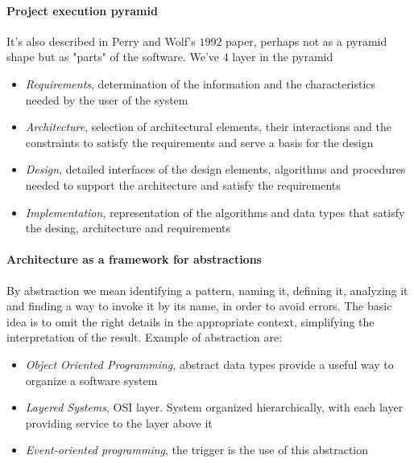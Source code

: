 \paragraph{Project execution pyramid}
\begin{center}
\end{center}
It's also described in Perry and Wolf's $1992$ paper, perhaps not as a pyramid shape but as "parts" of the software. We've $4$ layer in the pyramid
    \begin{itemize}
        \item \textit{Requirements}, determination of the information and the characteristics needed by the user of the system
        \item \textit{Architecture}, selection of architectural elements, their interactions and the constraints to satisfy the requirements and serve a basis for the design
        \item \textit{Design}, detailed interfaces of the design elements, algorithms and procedures needed to support the architecture and satisfy the requirements
        \item \textit{Implementation}, representation of the algorithms and data types that satisfy the desing, architecture and requirements
    \end{itemize}

\paragraph{Architecture as a framework for abstractions}
By abstraction we mean identifying a pattern, naming it, defining it, analyzing it and finding a way to invoke it by its name, in order to avoid errors. The basic idea is to omit the right details in the appropriate context, simplifying the interpretation of the result. Example of abstraction are:
\begin{itemize}
    \item \textit{Object Oriented Programming}, abstract data types provide a useful way to organize a software system
    \item \textit{Layered Systems}, OSI layer. System organized hierarchically, with each layer providing service to the layer above it
    \item \textit{Event-oriented programming}, the trigger is the use of this abstraction
\end{itemize}

